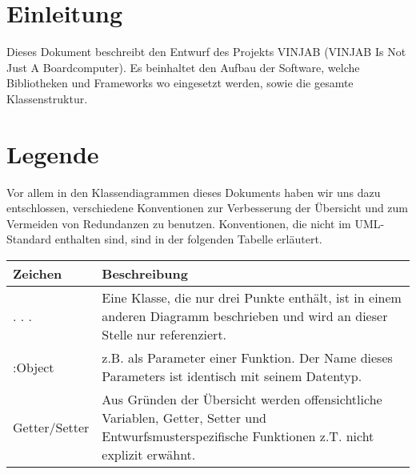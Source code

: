 \documentclass[entwurf.tex]{subfiles}
\begin{document}
\section{Einleitung}
Dieses Dokument beschreibt den Entwurf des Projekts VINJAB (VINJAB Is Not Just A Boardcomputer). Es beinhaltet den Aufbau der Software, welche Bibliotheken und Frameworks wo eingesetzt werden, sowie die gesamte Klassenstruktur.

\section{Legende}
Vor allem in den Klassendiagrammen dieses Dokuments haben wir uns dazu entschlossen, verschiedene Konventionen zur Verbesserung der Übersicht und zum Vermeiden von Redundanzen zu benutzen. Konventionen, die nicht im UML-Standard enthalten sind, sind in der folgenden Tabelle erläutert.

\begin{tabularx}{\textwidth}{ l|X }
	Zeichen	& Beschreibung\\
	\hline
	. . .	& Eine Klasse, die nur drei Punkte enthält, ist in einem anderen Diagramm beschrieben und wird an dieser Stelle nur referenziert.\\
	:Object	& z.B. als Parameter einer Funktion. Der Name dieses Parameters ist identisch mit seinem Datentyp.\\
	Getter/Setter & Aus Gründen der Übersicht werden offensichtliche Variablen, Getter, Setter und Entwurfsmusterspezifische Funktionen z.T.  nicht explizit erwähnt.
\end{tabularx}
\end{document}

